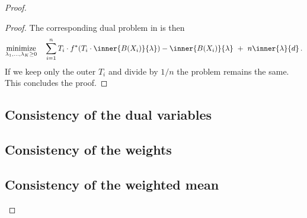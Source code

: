 \begin{proof}
\begin{proof}
The corresponding dual problem in \cite{Tseng1991} is then
\begin{gather*}
  \underset
  {\lambda_1,\ldots,\lambda_{K}\ge 0}
  {
  \mathrm{minimize}
  }
  \quad
  \sum_{i=1} 
  ^n
  T_i
  \cdot
  f^*
  (
  T_i \cdot\inner{B(X_i)}{\lambda}
  )
  -
  \inner{B(X_i)}{\lambda}
  \ 
  +
  \ 
  n\inner{\lambda}{d}
  \,.
\end{gather*}
  If we keep only the outer $T_i$ and divide by $1/n$ the problem remains the same.
  This concludes the proof.
  \end{proof}

\subsection*{Consistency of the dual variables}
\subsection*{Consistency of the weights}
\subsection*{Consistency of the weighted mean}
\end{proof}
